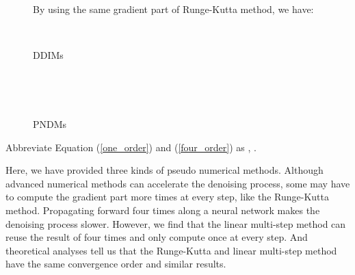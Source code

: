 \documentclass{article}
\begin{document}
\begin{figure}[h]
   \vspace*{-0.2cm}
   \begin{minipage}[t]{0.54\linewidth}
      \vspace*{-0.1cm}
      
      By using the same gradient part of Runge-Kutta method, we have:
      
   \end{minipage}
   \ \ 
   \vspace*{-\baselineskip}
   \begin{minipage}[t]{0.43\linewidth}
      \vspace*{-0.2cm}
      \begin{algorithm}[H]
         \small
         \caption{DDIMs}
         \label{origin_alg}
         \begin{algorithmic}[1]
            \STATE 
            \FOR {}
               \STATE  \\
            \ENDFOR
            \RETURN 
         \end{algorithmic}
      \end{algorithm}
      \vspace*{-0.7cm}
      \begin{algorithm}[H]
         \small
         \caption{PNDMs}
         \label{fourth_alg}
         \begin{algorithmic}[1]
            \STATE 
            \FOR {}
               \STATE  \\
            \ENDFOR
            \FOR {}
               \STATE 
            \ENDFOR
            \RETURN 
         \end{algorithmic}
      \end{algorithm}
      \vspace*{-0.5cm}
   \end{minipage}
\end{figure}

Abbreviate Equation (\ref{one_order}) and (\ref{four_order}) as , .








Here, we have provided three kinds of pseudo numerical methods. Although advanced numerical methods can accelerate the denoising process, some may have to compute the gradient part  more times at every step, like the Runge-Kutta method. Propagating forward four times along a neural network makes the denoising process slower. However, we find that the linear multi-step method can reuse the result of  four times and only compute  once at every step. And theoretical analyses tell us that the Runge-Kutta and linear multi-step method have the same convergence order and similar results. 
\end{document}
